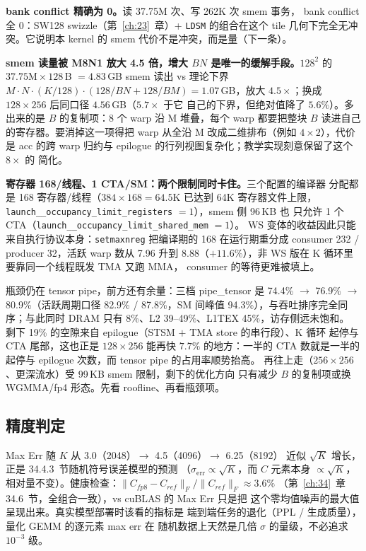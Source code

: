 \textbf{bank conflict 精确为 0。}读 37.75M 次、写 262K 次 smem 事务，
bank conflict 全 0：SW128 swizzle（第~\ref{ch:23}~章）+ \texttt{LDSM}
的组合在这个 tile 几何下完全无冲突。它说明本 kernel 的
smem 代价不是冲突，而是量（下一条）。

\textbf{smem 读量被 M8N1 放大 4.5 倍，增大 $BN$ 是唯一的缓解手段。}$128^2$ 的
$37.75\text{M}\times128$\,B $=4.83$\,GB smem 读出 vs 理论下界
$M\!\cdot\!N\!\cdot\!(K/128)\!\cdot\!(128/BN+128/BM)=1.07$\,GB，放大
$4.5\times$；换成 $128\times256$ 后同口径 $4.56$\,GB（$5.7\times$ 于它
自己的下界，但绝对值降了 $5.6\%$）。多出来的是 $B$ 的复制项：8 个 warp
沿 M 堆叠，每个 warp 都要把整块 $B$ 读进自己的寄存器。要消掉这一项得把
warp 从全沿 M 改成二维排布（例如 $4\times2$），代价是 acc 的跨 warp
归约与 epilogue 的行列视图复杂化；教学实现刻意保留了这个 $8\times$ 的
简化。

\textbf{寄存器 168/线程、1 CTA/SM：两个限制同时卡住。}三个配置的编译器
分配都是 168 寄存器/线程（$384\times168=64.5$K 已达到 64K 寄存器文件上限，
\texttt{launch\_\_occupancy\_limit\_registers} $=1$），smem 侧 96\,KB 也
只允许 1 个 CTA（\texttt{launch\_\_occupancy\_limit\_shared\_mem} $=1$）。
WS 变体的收益因此只能来自执行协议本身：\texttt{setmaxnreg} 把编译期的
168 在运行期重分成 consumer 232 / producer 32，活跃 warp 数从 7.96 升到
8.88（$+11.6\%$），非 WS 版在 K 循环里要靠同一个线程既发 TMA 又跑 MMA，
consumer 的等待更难被填上。

瓶颈仍在 tensor pipe，前方还有余量：三档
pipe\_tensor 是 74.4\% $\to$ 76.9\% $\to$ 80.9\%（活跃周期口径
82.9\% / 87.8\%，SM 间峰值 94.3\%），与吞吐排序完全同序；与此同时
DRAM 只有 8\%、L2 39--49\%、L1TEX 45\%，访存侧远未饱和。
剩下 19\% 的空隙来自 epilogue（STSM $+$ TMA store 的串行段）、K 循环
起停与 CTA 尾部，这也正是 $128\times256$ 能再快 $7.7\%$ 的地方：一半的
CTA 数就是一半的起停与 epilogue 次数，而 tensor pipe 的占用率顺势抬高。
再往上走（$256\times256$、更深流水）受 99\,KB smem 限制，剩下的优化方向
只有减少 $B$ 的复制项或换 WGMMA/fp4 形态。先看 roofline、再看瓶颈项。

\subsection{精度判定}

Max Err 随 $K$ 从 3.0（2048）$\to$ 4.5（4096）$\to$ 6.25（8192）
近似 $\sqrt{K}$ 增长，正是 34.4.3~节随机符号误差模型的预测
（$\sigma_{\text{err}}\propto\sqrt{K}$，而 $C$ 元素本身 $\propto\sqrt{K}$，
相对量不变）。健康检查：$\|C_{fp8}-C_{ref}\|_F/\|C_{ref}\|_F\approx 3.6\%$
（第~\ref{ch:34}~章 34.6~节，全组合一致），vs cuBLAS 的 Max Err 只是把
这个零均值噪声的最大值呈现出来。真实模型部署时该看的指标是
端到端任务的退化（PPL / 生成质量），量化 GEMM 的逐元素 max err 在
随机数据上天然是几倍 $\sigma$ 的量级，不必追求 $10^{-3}$ 级。

